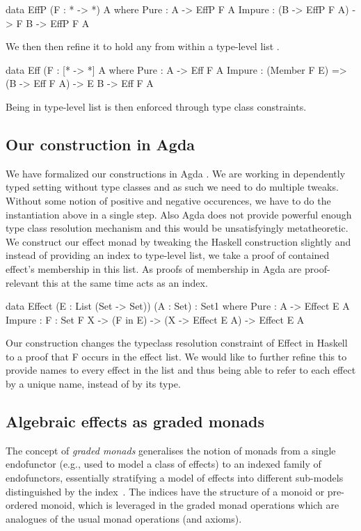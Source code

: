 \documentclass[10pt]{article}
\theoremstyle{definition}
\theoremstyle{remark}
\begin{document}
\begin{haskell}
	data EffP (F : * -> *) A where
		Pure : A -> EffP F A
		Impure : (B -> EffP F A) -> F B -> EffP F A
\end{haskell}
%

We then then refine it to hold any  from within a type-level list .
\begin{haskell}
      data Eff (F : [* -> *] A where
              Pure : A -> Eff F A
              Impure : (Member F E) => (B -> Eff F A) -> E B -> Eff F A
\end{haskell}
%

Being in type-level list
is then enforced through type class constraints.


\subsection{Our construction in Agda}

We have formalized our constructions in Agda \cite{repo}.
We are working in dependently typed setting without type classes and
as such we need to do multiple tweaks. Without some notion of
positive and negative occurences,
we have to do the instantiation above in a single step.
Also Agda does not provide powerful enough type class resolution
mechanism and this would be unsatisfyingly metatheoretic. We construct
our effect monad by tweaking the Haskell construction slightly and
instead of providing an index to type-level list, we take a proof of
contained effect's membership in this list. As proofs of membership in
Agda are proof-relevant this at the same time acts as an index.
\begin{haskell}
	data Effect (E : List (Set -> Set)) (A : Set) : Set1 where
	  Pure : A -> Effect E A
	  Impure : {F : Set} F X
	     -> (F in E)
	     -> (X -> Effect E A)
	     -> Effect E A
\end{haskell}
Our construction changes the typeclass resolution constraint of Effect in Haskell to a proof that F occurs in the effect list.
We would like to further refine this to provide names to every effect in the list
and thus being able to refer to each effect by a unique name, instead
of by its type.

\subsection{Algebraic effects as graded monads}

The concept of \emph{graded monads} generalises the notion of monads
from a single endofunctor (e.g., used to model a class of effects) to
an indexed family of endofunctors, essentially stratifying a model of
effects into different sub-models distinguished by the
index~\cite{DBLP:conf/popl/Katsumata14,DBLP:journals/corr/OrchardPM14}. The
indices have the structure of a monoid or pre-ordered monoid, which is
leveraged in the graded monad operations which are analogues of the
usual monad operations (and axioms).
\end{document}
